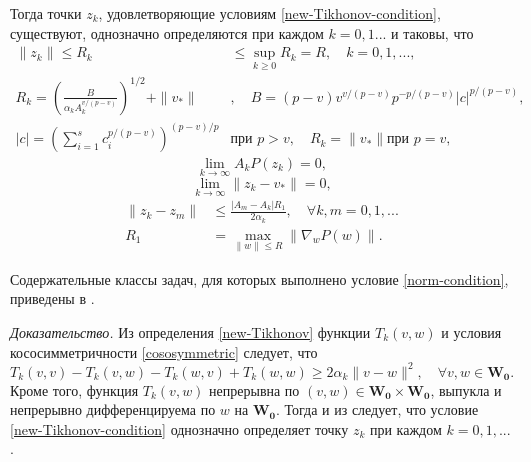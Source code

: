 \begin{theo}
	Тогда точки $z_k$, удовлетворяющие условиям \eqref{new-Tikhonov-condition}, существуют, однозначно определяются при каждом $k=0,1...$ и таковы, что
	\begin{equation}
	\label{[3]-12}
	\begin{aligned}
	\|z_k\|\leqslant R_k&\leqslant \sup\limits_{k\geqslant 0}R_k=R,\quad k=0,1,...,\\
	R_k=\left(\frac{B}{\alpha_k A_k^{v/(p-v)}} \right)^{1/2}+\|v_*\|&,\quad B=(p-v)v^{v/(p-v)}p^{-p/(p-v)}|c|^{p/(p-v)},\\
	|c|=\left(\sum\limits_{i=1}^{s}c_i^{p/(p-v)} \right)^{(p-v)/p}& \text{при } p>v,\quad R_k=\|v_*\| \text{при } p=v,
	\end{aligned}
	\end{equation}
	\begin{equation}
	\label{[3]-13}
	\lim_{k\rightarrow\infty}A_kP(z_k)=0,
	\end{equation}
	\begin{equation}
	\label{[3]-14}
	\lim_{k\rightarrow\infty}\|z_k-v_*\|=0,
	\end{equation}
	\begin{equation}
	\label{[3]-15}
	\begin{aligned}
	\|z_k-z_m\|&\leqslant \frac{|A_m-A_k|R_1}{2\alpha_k},\quad \forall k,m=0,1,...\\
	R_1&=\max\limits_{\|w\|\leqslant R}\|\nabla_w P(w)\|.
	\end{aligned}
	\end{equation}
\end{theo}
\begin{remark}
Содержательные классы задач, для которых выполнено условие \eqref{norm-condition}, приведены в \cite{centralbib}.
\end{remark}
\noindent\emph{Доказательство.} Из определения \eqref{new-Tikhonov} функции $T_k(v,w)$ и условия кососимметричности \eqref{cososymmetric} следует, что
\begin{equation}
\label{[3]-16}
T_k(v,v)-T_k(v,w)-T_k(w,v)+T_k(w,w)\geqslant 2\alpha_k\|v-w\|^2,\quad \forall v,w\in\mathbf{W_0}.
\end{equation}
Кроме того, функция $T_k(v,w)$ непрерывна по $(v,w)\in\mathbf{W_0}\times\mathbf{W_0}$, выпукла и непрерывно дифференцируема по $w$ на $\mathbf{W_0}$. Тогда и из \cite{4} следует, что условие \eqref{new-Tikhonov-condition} однозначно определяет точку $z_k$ при каждом $k=0,1,...$.

